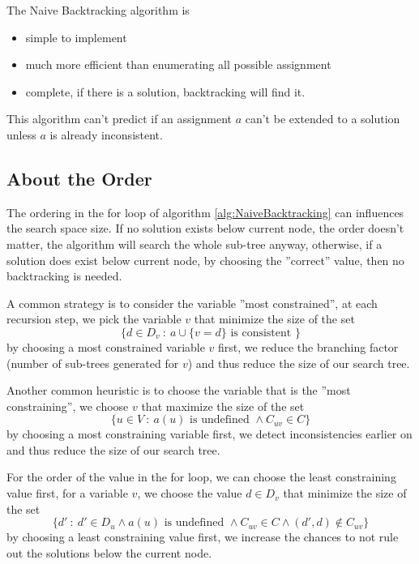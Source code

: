 \documentclass[10pt, letterpaper]{report}
\begin{document}
\noindent The Naive Backtracking algorithm is\begin{itemize}
    \item simple to implement 
    \item much more efficient than enumerating all possible assignment
    \item complete, if there is a solution, backtracking
will find it.
\end{itemize}
This algorithm can't predict if an assignment $a$ can't be extended to a solution unless $a$ is already inconsistent.
\subsection{About the Order}
The ordering in the for loop of algorithm \ref{alg:NaiveBacktracking} can  influences the search space size. If no solution exists below current node, the order doesn't matter, the algorithm will search the whole sub-tree anyway, otherwise, if a solution does exist below current node, by choosing the ''correct'' value, then no backtracking is needed.\bigskip 

A common strategy is to consider the variable ''most constrained'', at each recursion step, we pick the variable $v$ that minimize the size of the set\begin{equation}
    \{d\in D_v \ : \ a\cup\{v=d\} \text{ is consistent }\}
\end{equation}
by choosing a most constrained variable $v$ first, we reduce the
branching factor (number of sub-trees generated for $v$) and thus reduce
the size of our search tree.\bigskip 

Another common heuristic is to choose the variable that is the ''most constraining'', we choose $v$ that maximize the size of the set\begin{equation}
    \{u\in V \ : \ a(u)\text{ is undefined }\land C_{uv}\in C \}
\end{equation}
by choosing a most constraining variable first, we detect
inconsistencies earlier on and thus reduce the size of our search tree.\bigskip 

For the order of the value in the for loop, we can choose the least constraining value first, for a variable $v$, we choose the value $d\in D_v$ that minimize the size of the set\begin{equation}
    \{d' \ : \ d'\in D_u\land a(u)\text{ is undefined }\land C_{uv}\in C\land (d',d)\notin C_{uv}\}
\end{equation}
by choosing a least constraining value first, we increase the chances
to not rule out the solutions below the current node.
\end{document}
